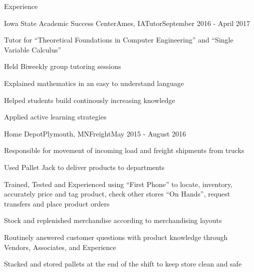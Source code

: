 \documentclass{resume} %
\begin{document}
\begin{rSection}{Experience}

\begin{rSubsection}{Iowa State Academic Success Center}{Ames, IA}{Tutor}{September 2016 - April 2017}
    \item {Tutor for ``Theoretical Foundations in Computer Engineering'' and ``Single Variable Calculus''}
    \item {Held Biweekly group tutoring sessions}
    \item {Explained mathematics in an easy to understand language}
    \item {Helped students build continously increasing knowledge}
       \item {Applied active learning strategies}
\end{rSubsection}

\begin{rSubsection}{Home Depot}{Plymouth, MN}{Freight}{May 2015 - August 2016}
    \item {Responsible for movement of incoming load and freight shipments from trucks }
    \item {Used Pallet Jack to deliver products to departments}
    \item {Trained, Tested and Experienced using ``First Phone'' to locate, inventory, accurately price and tag product, check other stores ``On Hands'', request transfers and place product orders}
    \item {Stock and replenished merchandise according to merchandising layouts}
    \item {Routinely answered customer questions with product knowledge through Vendors, Associates, and Experience}
        \item {Stacked and stored pallets at the end of the shift to keep store clean and safe}
\end{rSubsection}
	




\end{rSection}
\end{document}
